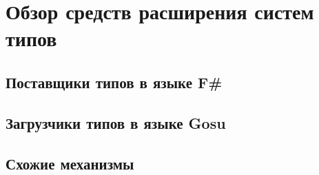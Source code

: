 \section{Обзор средств расширения систем типов}
\subsection{Поставщики типов в языке F\#}
\subsection{Загрузчики типов в языке Gosu}
\subsection{Схожие механизмы}
